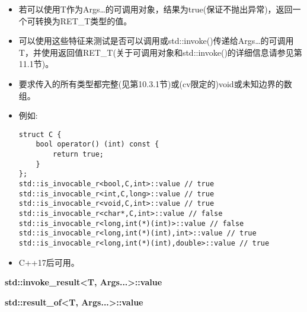 \begin{itemize}
\item 
若可以使用T作为Args…的可调用对象，结果为true(保证不抛出异常)，返回一个可转换为RET\_T类型的值。

\item 
可以使用这些特征来测试是否可以调用或std::invoke()传递给Args…的可调用T，并使用返回值RET\_T(关于可调用对象和std::invoke()的详细信息请参见第11.1节)。

\item 
要求传入的所有类型都完整(见第10.3.1节)或(cv限定的)void或未知边界的数组。

\item 
例如:
\begin{lstlisting}[style=styleCXX]
struct C {
	bool operator() (int) const {
		return true;
	}
};
std::is_invocable_r<bool,C,int>::value // true
std::is_invocable_r<int,C,long>::value // true
std::is_invocable_r<void,C,int>::value // true
std::is_invocable_r<char*,C,int>::value // false
std::is_invocable_r<long,int(*)(int)>::value // false
std::is_invocable_r<long,int(*)(int),int>::value // true
std::is_invocable_r<long,int(*)(int),double>::value // true
\end{lstlisting}

\item 
C++17后可用。
\end{itemize}

\textbf{std::invoke\_result<T, Args...>::value}

\textbf{std::result\_of<T, Args...>::value}

